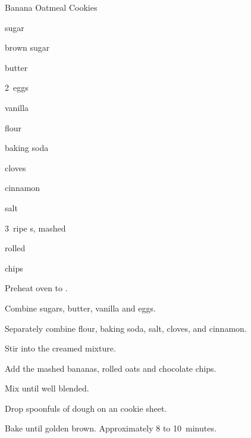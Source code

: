 \begin{recipe}{Banana Oatmeal Cookies}{}{}

\begin{ingredients}
\item \C{\half} sugar
\item \C{\half} brown sugar
\item {} butter
\item 2~eggs
\item {} vanilla
\item {} flour
\item {} baking soda
\item \tp{\half} cloves
\item {} cinnamon
\item \tp{\eighth} salt
\item 3~ripe s, mashed
\item {} rolled 
\item {}  chips
\end{ingredients}

\begin{directions}
\item Preheat oven to .
\item Combine sugars, butter, vanilla and eggs.
\item Separately combine flour, baking soda, salt, cloves, and cinnamon.
\item Stir into the creamed mixture.
\item Add the mashed bananas, rolled oats and chocolate chips.
\item Mix until well blended.
\item Drop spoonfuls of dough on an cookie sheet.
\item Bake until golden brown. Approximately 8 to 10~minutes. 
\end{directions}
\end{recipe}
